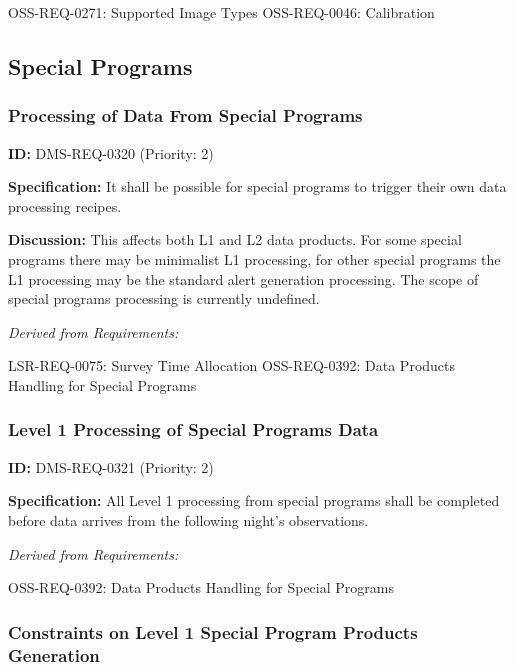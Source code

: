 \documentclass[SE,toc,lsstdraft]{lsstdoc}
\begin{document}
OSS-REQ-0271:
Supported Image Types \newline
OSS-REQ-0046:
Calibration \newline

\subsection{Special Programs}

\subsubsection{Processing of Data From Special Programs}

\label{DMS-REQ-0320}
\textbf{ID:} DMS-REQ-0320 (Priority: 2)

\textbf{Specification:} It shall be possible for special programs to trigger their own data processing recipes.

\textbf{Discussion:} This affects both L1 and L2 data products. For some special programs there may be minimalist L1 processing, for other special programs the L1 processing may be the standard alert generation processing. The scope of special programs processing is currently undefined.

\emph{Derived from Requirements:}

LSR-REQ-0075:
Survey Time Allocation \newline
OSS-REQ-0392:
Data Products Handling for Special Programs \newline

\subsubsection{Level 1 Processing of Special Programs Data}

\label{DMS-REQ-0321}
\textbf{ID:} DMS-REQ-0321 (Priority: 2)

\textbf{Specification:} All Level 1 processing from special programs shall be completed before data arrives from the following night's observations.

\emph{Derived from Requirements:}

OSS-REQ-0392:
Data Products Handling for Special Programs \newline

\subsubsection{Constraints on Level 1 Special Program Products Generation}
\end{document}
